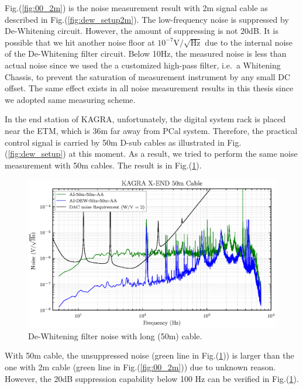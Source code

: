 Fig.(\ref{fig:00_2m}) is the noise measurement result with 2m signal cable as described in Fig.(\ref{fig:dew_setup2m}). The low-frequency noise is suppressed by De-Whitening circuit. However, the amount of suppressing is not 20dB. It is possible that we hit another noise floor at $10^{-7}\mathrm{V}/\sqrt{\mathrm{Hz}}$ due to the internal noise of the De-Whitening filter circuit. Below 10Hz, the measured noise is less than actual noise since we used the a customized high-pass filter, i.e.\ a Whitening Chassis, to prevent the saturation of measurement instrument by any small DC offset. The same effect exists in all noise measurement results in this thesis since we adopted same measuring scheme.


In the end station of KAGRA, unfortunately, the digital system rack is placed near the ETM, which is 36m far away from PCal system. Therefore, the practical control signal is carried by 50m D-sub cables as illustrated in Fig.(\ref{fig:dew_setup}) at this moment. As a result, we tried to perform the same noise measurement with 50m cables. The result is in Fig.(\ref{fig:00_50m}).
\begin{figure}[hbt!]
\centering
\includegraphics[width=1\textwidth]{figure/noise/00_50m}
\caption[De-Whitening filter noise with long cable]{ De-Whitening filter noise with long (50m) cable. }
\label{fig:00_50m}
\end{figure}

With 50m cable, the unsuppressed noise (green line in Fig.(\ref{fig:00_50m})) is larger than the one with 2m cable (green line in Fig.(\ref{fig:00_2m})) due to unknown reason. However, the 20dB suppression capability below 100 Hz can be verified in Fig.(\ref{fig:00_50m}). 






